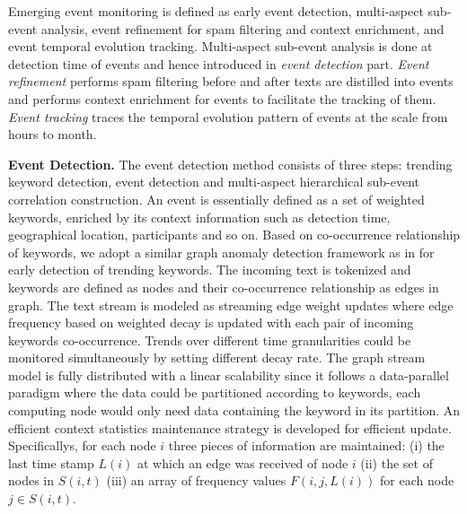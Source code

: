 Emerging event monitoring is defined as early event detection, multi-aspect sub-event analysis, event refinement for spam filtering and context enrichment, and event temporal evolution tracking.
Multi-aspect sub-event analysis is done at detection time of events and hence introduced in \emph{event detection} part.
\emph{Event refinement} performs spam filtering before and after texts are distilled into events and performs context enrichment for events to facilitate the tracking of them.
\emph{Event tracking} traces the temporal evolution pattern of events at the scale from hours to month.


\noindent\textbf{Event Detection.}
\label{detection}
The event detection method consists of three steps: trending keyword detection, event detection and multi-aspect hierarchical sub-event correlation construction.
An event is essentially defined as a set of weighted keywords, enriched by its context information such as detection time, geographical location, participants and so on.
Based on co-occurrence relationship of keywords, we adopt a similar graph anomaly detection framework as in \cite{yu2013anomalous} for early detection of trending keywords.
The incoming text is tokenized and keywords are defined as nodes and their co-occurrence relationship as edges in graph.
The text stream is modeled as streaming edge weight updates where edge frequency based on weighted decay is updated with each pair of incoming keywords co-occurrence.
Trends over different time granularities could be monitored simultaneously by setting different decay rate.
The graph stream model is fully distributed with a linear scalability since it follows a data-parallel paradigm where the data could be partitioned according to keywords, \ie each computing node would only need data containing the keyword in its partition.
An efficient context statistics maintenance strategy is developed for efficient update.
Specificallys, for each node $i$ three pieces of information are maintained:
(i) the last time stamp $L(i)$ at which an edge was received of node $i$
(ii) the set of nodes in $S(i,t)$
(iii) an array of frequency values $F(i, j, L(i))$ for each node $j\in S(i,t)$.

